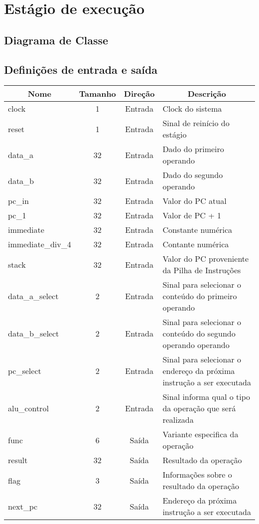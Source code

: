 \section{Estágio de execução}
	\subsection{Diagrama de Classe}
  \begin{figure}[h]
    
  \end{figure}
		
		\subsection{Definições de entrada e saída}
		
	\begin{center}
		\begin{longtable}[pos]{| l | c | c | m{7cm} |} \hline
			\multicolumn{1}{|c|}{\cellcolor[gray]{0.9}\textbf{Nome}} & 
			\multicolumn{1}{c|}{\cellcolor[gray]{0.9}\textbf{Tamanho}} & 
			\multicolumn{1}{c|}{\cellcolor[gray]{0.9}\textbf{Direção}} &
			\multicolumn{1}{c|}{\cellcolor[gray]{0.9}\textbf{Descrição}} \\ \hline
			\endhead
			\hline
			\endlastfoot

			clock & 1 & Entrada & Clock do sistema \\ \hline
			reset & 1 & Entrada & Sinal de reinício do estágio\\ \hline
			data\_a & 32 & Entrada & Dado do primeiro operando \\ \hline
			data\_b & 32 & Entrada & Dado do segundo operando \\ \hline
			pc\_in & 32 & Entrada & Valor do PC atual \\ \hline
			pc\_1 & 32 & Entrada & Valor de PC + 1\\ \hline
			immediate & 32 & Entrada & Constante numérica  \\ \hline
			immediate\_div\_4 & 32 & Entrada & Contante numérica \\\hline
			stack & 32 & Entrada & Valor do PC proveniente da Pilha de Instruções \\\hline
			data\_a\_select & 2 & Entrada & Sinal para selecionar o conteúdo do primeiro operando \\\hline
			data\_b\_select & 2 & Entrada & Sinal para selecionar o conteúdo do segundo operando operando \\\hline
			pc\_select & 2 & Entrada & Sinal para selecionar o endereço da próxima instrução a ser executada \\\hline
			alu\_control & 2 & Entrada & Sinal informa qual o tipo da operação que será realizada\\\hline
			func & 6 & Saída & Variante especifica da operação \\\hline
			result & 32 & Saída & Resultado da operação \\\hline
			flag & 3 & Saída & Informações sobre o resultado da operação \\\hline
			next\_pc & 32 & Saída & Endereço da próxima instrução a ser executada\\\hline
			

\end{longtable}
\end{center}
